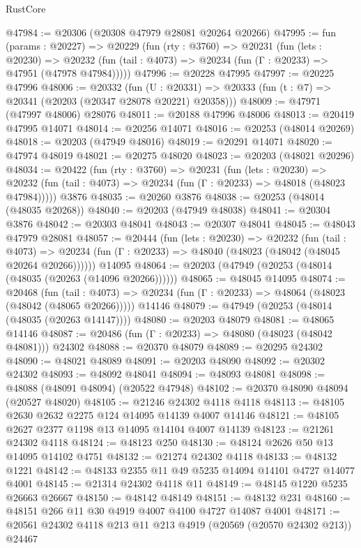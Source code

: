 \begin{lexlean}{RustCore}
\begin{coremodule}
@47984 := @20306 (@20308 @47979 @28081 @20264 @20266)
@47995 := fun (params : @20227) =>
  @20229
    (fun (rty : @3760) =>
    @20231
      (fun (lets : @20230) =>
      @20232 (fun (tail : @4073) => @20234 (fun (Γ : @20233) => @47951 (@47978 @47984)))))
@47996 := @20228 @47995
@47997 := @20225 @47996
@48006 := @20332
    (fun (U : @20331) => @20333 (fun (t : @7) => @20341 (@20203 (@20347 @28078 @20221) @20358)))
@48009 := @47971 (@47997 @48006) @28076
@48011 := @20188 @47996 @48006
@48013 := @20419 @47995 @14071
@48014 := @20256 @14071
@48016 := @20253 (@48014 @20269)
@48018 := @20203 (@47949 @48016)
@48019 := @20291 @14071
@48020 := @47974 @48019
@48021 := @20275 @48020
@48023 := @20203 (@48021 @20296)
@48034 := @20422
    (fun (rty : @3760) =>
    @20231
      (fun (lets : @20230) =>
      @20232 (fun (tail : @4073) => @20234 (fun (Γ : @20233) => @48018 (@48023 @47984)))))
    @3876
@48035 := @20260 @3876
@48038 := @20253 (@48014 (@48035 @20268))
@48040 := @20203 (@47949 @48038)
@48041 := @20304 @3876
@48042 := @20303 @48041
@48043 := @20307 @48041
@48045 := @48043 @47979 @28081
@48057 := @20444
    (fun (lets : @20230) =>
    @20232
      (fun (tail : @4073) =>
      @20234 (fun (Γ : @20233) => @48040 (@48023 (@48042 (@48045 @20264 @20266))))))
    @14095
@48064 := @20203 (@47949 (@20253 (@48014 (@48035 (@20263 (@14096 @20266))))))
@48065 := @48045 @14095
@48074 := @20468
    (fun (tail : @4073) => @20234 (fun (Γ : @20233) => @48064 (@48023 (@48042 (@48065 @20266)))))
    @14146
@48079 := @47949 (@20253 (@48014 (@48035 (@20263 @14147))))
@48080 := @20203 @48079
@48081 := @48065 @14146
@48087 := @20486 (fun (Γ : @20233) => @48080 (@48023 (@48042 @48081))) @24302
@48088 := @20370 @48079
@48089 := @20295 @24302
@48090 := @48021 @48089
@48091 := @20203 @48090
@48092 := @20302 @24302
@48093 := @48092 @48041
@48094 := @48093 @48081
@48098 := @48088 (@48091 @48094) (@20522 @47948)
@48102 := @20370 @48090 @48094 (@20527 @48020)
@48105 := @21246 @24302 @4118 @4118
@48113 := @48105 @2630 @2632 @2275 @124 @14095 @14139 @4007 @14146
@48121 := @48105 @2627 @2377 @1198 @13 @14095 @14104 @4007 @14139
@48123 := @21261 @24302 @4118
@48124 := @48123 @250
@48130 := @48124 @2626 @50 @13 @14095 @14102 @4751
@48132 := @21274 @24302 @4118
@48133 := @48132 @1221
@48142 := @48133 @2355 @11 @49 @5235 @14094 @14101 @4727 @14077 @4001
@48145 := @21314 @24302 @4118 @11
@48149 := @48145 @1220 @5235 @26663 @26667
@48150 := @48142 @48149
@48151 := @48132 @231
@48160 := @48151 @266 @11 @30 @4919 @4007 @4100 @4727 @14087 @4001
@48171 := @20561 @24302 @4118 @213 @11 @213 @4919 (@20569 (@20570 @24302 @213)) @24467

\end{coremodule}
\end{lexlean}
